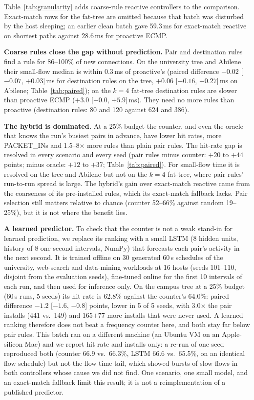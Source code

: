 \documentclass[conference]{IEEEtran}
\begin{document}
Table~\ref{tab:granularity} adds coarse-rule reactive controllers to the comparison. Exact-match rows for the fat-tree are omitted because that batch was disturbed by the host sleeping; an earlier clean batch gave 59.3\,ms for exact-match reactive on shortest paths against 28.6\,ms for proactive ECMP.

\textbf{Coarse rules close the gap without prediction.} Pair and destination rules find a rule for 86--100\% of new connections. On the university tree and Abilene their small-flow median is within 0.3\,ms of proactive's (paired difference $-0.02$ [$-0.07$, $+0.03$]\,ms for destination rules on the tree, $+0.06$ [$-0.16$, $+0.27$]\,ms on Abilene; Table~\ref{tab:paired}); on the $k{=}4$ fat-tree destination rules are slower than proactive ECMP ($+3.0$ [$+0.0$, $+5.9$]\,ms). They need no more rules than proactive (destination rules: 80 and 120 against 624 and 386).

\textbf{The hybrid is dominated.} At a 25\% budget the counter, and even the oracle that knows the run's busiest pairs in advance, have lower hit rates, more PACKET\_INs and 1.5--8$\times$ more rules than plain pair rules. The hit-rate gap is resolved in every scenario and every seed (pair rules minus counter: $+20$ to $+44$ points; minus oracle: $+12$ to $+37$; Table~\ref{tab:paired}). For small-flow time it is resolved on the tree and Abilene but not on the $k{=}4$ fat-tree, where pair rules' run-to-run spread is large. The hybrid's gain over exact-match reactive came from the coarseness of its pre-installed rules, which its exact-match fallback lacks. Pair selection still matters relative to chance (counter 52--66\% against random 19--25\%), but it is not where the benefit lies.

\textbf{A learned predictor.} To check that the counter is not a weak stand-in for learned prediction, we replace its ranking with a small LSTM (8 hidden units, history of 8 one-second intervals, NumPy) that forecasts each pair's activity in the next second. It is trained offline on 30 generated 60\,s schedules of the university, web-search and data-mining workloads at 16 hosts (seeds 101--110, disjoint from the evaluation seeds), fine-tuned online for the first 10 intervals of each run, and then used for inference only. On the campus tree at a 25\% budget (60\,s runs, 5 seeds) its hit rate is 62.8\% against the counter's 64.0\%: paired difference $-1.2$ [$-1.6$, $-0.8$] points, lower in 5 of 5 seeds, with 3.0$\times$ the pair installs (441 vs.\ 149) and 165$\pm$77 more installs that were never used. A learned ranking therefore does not beat a frequency counter here, and both stay far below pair rules. This batch ran on a different machine (an Ubuntu VM on an Apple-silicon Mac) and we report hit rate and installs only: a re-run of one seed reproduced both (counter 66.9 vs.\ 66.3\%, LSTM 66.6 vs.\ 65.5\%, on an identical flow schedule) but not the flow-time tail, which showed bursts of slow flows in both controllers whose cause we did not find. One scenario, one small model, and an exact-match fallback limit this result; it is not a reimplementation of a published predictor.
\end{document}
